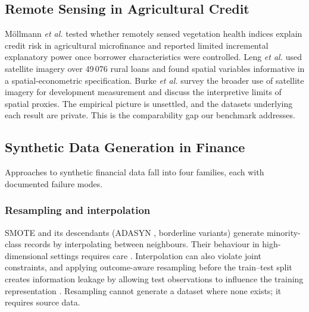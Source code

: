 \documentclass[journal]{IEEEtran}
\begin{document}
\subsection{Remote Sensing in Agricultural Credit}
M\"ollmann \textit{et al.} \cite{mollmann2020vegetation} tested whether remotely sensed vegetation health indices explain credit risk in agricultural microfinance and reported limited incremental explanatory power once borrower characteristics were controlled. Leng \textit{et al.} \cite{leng2026satellite} used satellite imagery over 49\,076 rural loans and found spatial variables informative in a spatial-econometric specification. Burke \textit{et al.} \cite{burke2021satellite} survey the broader use of satellite imagery for development measurement and discuss the interpretive limits of spatial proxies. The empirical picture is unsettled, and the datasets underlying each result are private. This is the comparability gap our benchmark addresses.

\subsection{Synthetic Data Generation in Finance}
\label{sec:related-synth}
Approaches to synthetic financial data fall into four families, each with documented failure modes.

\subsubsection{Resampling and interpolation}
SMOTE \cite{chawla2002smote} and its descendants (ADASYN \cite{he2008adasyn}, borderline variants) generate minority-class records by interpolating between neighbours. Their behaviour in high-dimensional settings requires care \cite{blagus2013smote}. Interpolation can also violate joint constraints, and applying outcome-aware resampling before the train--test split creates information leakage by allowing test observations to influence the training representation \cite{kapoor2023leakage}. Resampling cannot generate a dataset where none exists; it requires source data.
\end{document}
